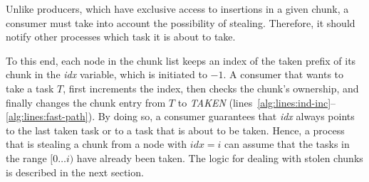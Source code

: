 Unlike producers, which have exclusive access to insertions in a given chunk, a consumer must take into account the possibility of stealing. 
Therefore, it should notify other processes which task it is about to take. 

To this end, each node in the chunk list keeps an index of the taken prefix of its chunk in the \emph{idx} variable, which is initiated to $-1$. 
A consumer that wants to take a task $T$, first increments the index, then checks the chunk's ownership, and finally changes the chunk entry from $T$ to \emph{TAKEN} (lines~\ref{alg:lines:ind-inc}--\ref{alg:lines:fast-path}). By doing so, a consumer guarantees that \emph{idx} always points to the last taken task or to a task that is about to be taken. Hence, a process that is stealing a chunk from a node with $\textit{idx} = i$ can assume that the tasks in the range $[0 \ldots i)$ have already been taken. The logic for dealing with stolen chunks is described in the next section.



